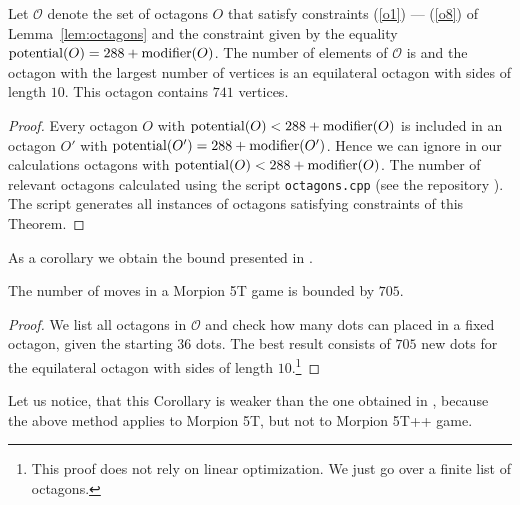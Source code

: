 \begin{theorem}
\label{thm:octagons_in_o}
  Let $\mathcal{O}$ denote the set of octagons $O$ that satisfy constraints (\ref{o1}) --- (\ref{o8}) of Lemma~\ref{lem:octagons} and the constraint given by the equality $\operatorname{potential}(O) = 288 + \operatorname{modifier}(O)$.
  The number of elements of $\mathcal{O}$ is \theoctagons and the octagon with the largest number of vertices is an equilateral octagon with sides of length $10$. This octagon contains $741$ vertices.
\end{theorem}


\begin{proof} %
Every octagon $O$ with $\operatorname{potential}(O) < 288 + \operatorname{modifier}(O)$ is included in an octagon $O'$ with $\operatorname{potential}(O') = 288 + \operatorname{modifier}(O')$. Hence we can ignore in our calculations octagons with $\operatorname{potential}(O) < 288 + \operatorname{modifier}(O)$.
The number of relevant octagons calculated using the script {\tt octagons.cpp} (see the repository \cite{thewebpage}). The script generates all instances of octagons satisfying constraints of this Theorem. %
\end{proof}

\noindent
As a corollary we obtain the bound presented in \cite{demaine}.
\begin{corollary}
  The number of moves in a Morpion 5T game is bounded by $705$.%
\end{corollary}
\begin{proof} We list all octagons in ${\mathcal O}$ and check how many dots can placed in a fixed octagon, given the starting $36$ dots. The best result consists of $705$ new dots for the equilateral octagon with sides of length $10$.\footnote{This proof does not rely on linear optimization. We just go over a finite list of octagons.}
\end{proof}

\noindent
Let us notice, that this Corollary is weaker than the one obtained in \cite{demaine}, because the above method applies to Morpion 5T, but not to Morpion 5T++ game. 

